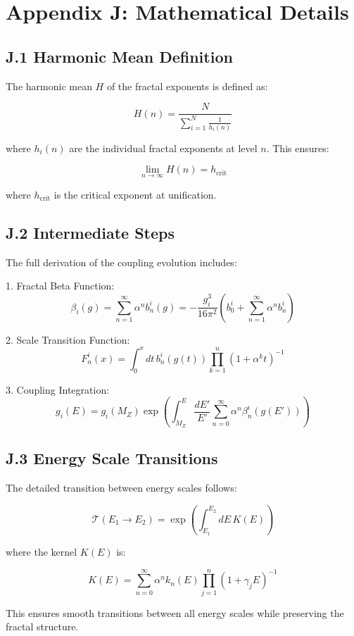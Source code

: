 \section*{Appendix J: Mathematical Details}

\subsection*{J.1 Harmonic Mean Definition}

The harmonic mean $H$ of the fractal exponents is defined as:

\[
H(n) = \frac{N}{\sum_{i=1}^N \frac{1}{h_i(n)}}
\]

where $h_i(n)$ are the individual fractal exponents at level $n$. This ensures:

\[
\lim_{n \to \infty} H(n) = h_{\text{crit}}
\]

where $h_{\text{crit}}$ is the critical exponent at unification.

\subsection*{J.2 Intermediate Steps}

The full derivation of the coupling evolution includes:

1. Fractal Beta Function:
   \[
   \beta_i(g) = \sum_{n=1}^{\infty} \alpha^n b_n^i(g) = -\frac{g_i^3}{16\pi^2}\left(b_0^i + \sum_{n=1}^{\infty} \alpha^n b_n^i\right)
   \]

2. Scale Transition Function:
   \[
   F_n^i(x) = \int_0^x dt\, b_n^i(g(t))\prod_{k=1}^n (1 + \alpha^k t)^{-1}
   \]

3. Coupling Integration:
   \[
   g_i(E) = g_i(M_Z)\exp\left(\int_{M_Z}^E \frac{dE'}{E'}\sum_{n=0}^{\infty} \alpha^n \beta_n^i(g(E'))\right)
   \]

\subsection*{J.3 Energy Scale Transitions}

The detailed transition between energy scales follows:

\[
\mathcal{T}(E_1 \to E_2) = \exp\left(\int_{E_1}^{E_2} dE\, K(E)\right)
\]

where the kernel $K(E)$ is:

\[
K(E) = \sum_{n=0}^{\infty} \alpha^n k_n(E)\prod_{j=1}^n (1 + \gamma_j E)^{-1}
\]

This ensures smooth transitions between all energy scales while preserving the fractal structure. 